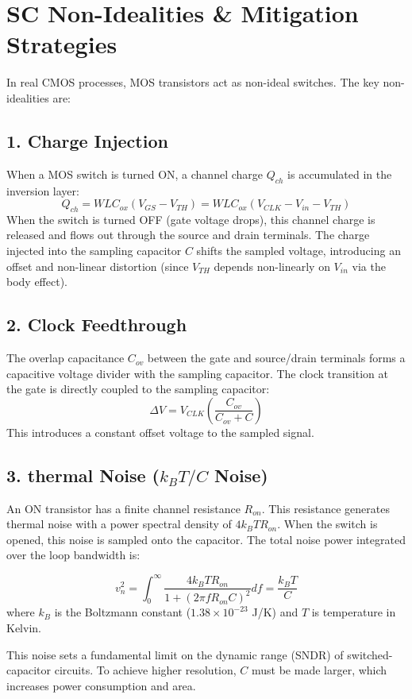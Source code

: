 \documentclass[12pt,a4paper]{article}
\begin{document}
\section{SC Non-Idealities \& Mitigation Strategies}

In real CMOS processes, MOS transistors act as non-ideal switches. The key non-idealities are:

\subsection{1. Charge Injection}
When a MOS switch is turned ON, a channel charge $Q_{ch}$ is accumulated in the inversion layer:
\[
Q_{ch} = W L C_{ox} (V_{GS} - V_{TH}) = W L C_{ox} (V_{CLK} - V_{in} - V_{TH})
\]
When the switch is turned OFF (gate voltage drops), this channel charge is released and flows out through the source and drain terminals. The charge injected into the sampling capacitor $C$ shifts the sampled voltage, introducing an offset and non-linear distortion (since $V_{TH}$ depends non-linearly on $V_{in}$ via the body effect).

\subsection{2. Clock Feedthrough}
The overlap capacitance $C_{ov}$ between the gate and source/drain terminals forms a capacitive voltage divider with the sampling capacitor. The clock transition at the gate is directly coupled to the sampling capacitor:
\[
\Delta V = V_{CLK} \left( \frac{C_{ov}}{C_{ov} + C} \right)
\]
This introduces a constant offset voltage to the sampled signal.

\subsection{3. thermal Noise ($k_B T / C$ Noise)}
An ON transistor has a finite channel resistance $R_{on}$. This resistance generates thermal noise with a power spectral density of $4 k_B T R_{on}$. When the switch is opened, this noise is sampled onto the capacitor. The total noise power integrated over the loop bandwidth is:
\begin{tcolorbox}[formulabox, title={\textbf{Thermal Noise Limit (kT/C)}}]
\[
v_n^2 = \int_0^{\infty} \frac{4 k_B T R_{on}}{1 + (2\pi f R_{on} C)^2} df = \frac{k_B T}{C}
\]
where $k_B$ is the Boltzmann constant ($1.38 \times 10^{-23}$ J/K) and $T$ is temperature in Kelvin.
\end{tcolorbox}
This noise sets a fundamental limit on the dynamic range (SNDR) of switched-capacitor circuits. To achieve higher resolution, $C$ must be made larger, which increases power consumption and area.
\end{document}
